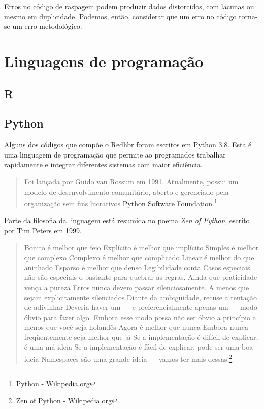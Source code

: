 \documentclass[
]{book}
\begin{document}
Erros no código de raspagem podem produzir dados distorcidos, com lacunas ou mesmo em duplicidade. Podemos, então, considerar que um erro no código torna-se um erro metodológico.

\hypertarget{linguagens-de-programauxe7uxe3o}{%
\chapter{Linguagens de programação}\label{linguagens-de-programauxe7uxe3o}}

\hypertarget{r}{%
\section{R}\label{r}}

\hypertarget{python}{%
\section{Python}\label{python}}

Alguns dos códigos que compõe o Redhbr foram escritos em \href{https://www.python.org/}{Python 3.8}. Esta é uma linguagem de programação que permite ao programados trabalhar rapidamente e integrar diferentes sistemas com maior eficiência.

\begin{quote}
Foi lançada por Guido van Rossum em 1991. Atualmente, possui um modelo de desenvolvimento comunitário, aberto e gerenciado pela organização sem fins lucrativos \href{https://www.python.org/psf/}{Python Software Foundation}.\footnote{\href{https://pt.wikipedia.org/wiki/Python}{Python - Wikipedia.org}}
\end{quote}

Parte da filosofia da linguagem está resumida no poema \emph{Zen of Python}, \href{https://pt.wikipedia.org/wiki/Python}{escrito por Tim Peters em 1999}.

\begin{quote}
Bonito é melhor que feio
Explícito é melhor que implícito
Simples é melhor que complexo
Complexo é melhor que complicado
Linear é melhor do que aninhado
Esparso é melhor que denso
Legibilidade conta
Casos especiais não são especiais o bastante para quebrar as regras.
Ainda que praticidade vença a pureza
Erros nunca devem passar silenciosamente.
A menos que sejam explicitamente silenciados
Diante da ambiguidade, recuse a tentação de adivinhar
Deveria haver um --- e preferencialmente apenas um --- modo óbvio para fazer algo.
Embora esse modo possa não ser óbvio a princípio a menos que você seja holandês
Agora é melhor que nunca
Embora nunca freqüentemente seja melhor que já
Se a implementação é difícil de explicar, é uma má ideia
Se a implementação é fácil de explicar, pode ser uma boa ideia
Namespaces são uma grande ideia --- vamos ter mais dessas!\footnote{\href{https://pt.wikipedia.org/wiki/Zen_of_Python}{Zen of Python - Wikipedia.org}}
\end{quote}
\end{document}
